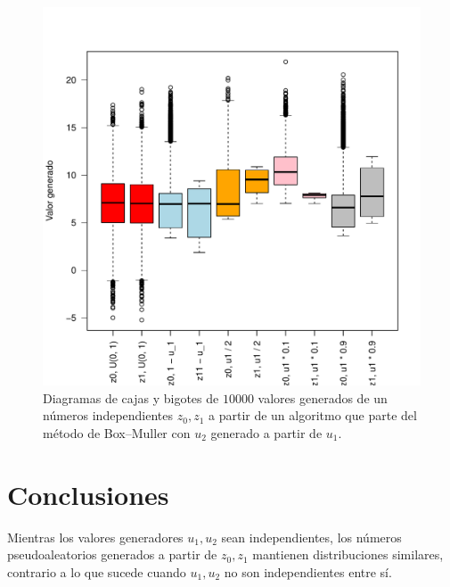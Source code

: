 \documentclass[paper=leter, fontsize=11pt]{scrartcl}
\numberwithin{equation}{section}		%
\numberwithin{figure}{section}			%
\numberwithin{table}{section}				%
\begin{document}
\begin{figure}
    \centering
    \includegraphics[width=1\textwidth]{dependientes.pdf}
    \caption{Diagramas de cajas y bigotes de $10000$ valores generados de un números independientes $z_0, z_1$ a partir de un algoritmo que parte del método de Box--Muller con $u_2$ generado a partir de $u_1$.}
    \label{dependientes}
\end{figure}

\section{Conclusiones}
Mientras los valores generadores $u_1, u_2$ sean independientes, los números pseudoaleatorios generados a partir de $z_0, z_1$ mantienen distribuciones similares, contrario a lo que sucede cuando $u_1, u_2$ no son independientes entre sí. 



\end{document}
